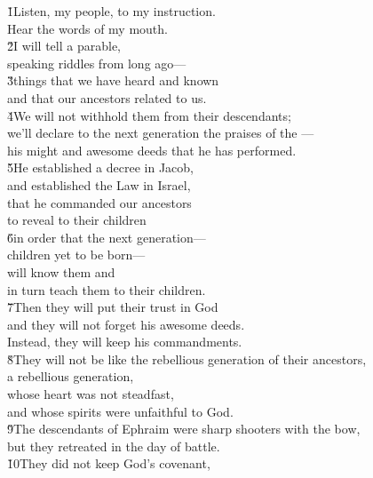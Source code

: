 \begin{poetry}
\poeml \v{1}Listen, my people, to my instruction. \\
\poemll    Hear the words of my mouth. \\
\poeml \v{2}I will tell a parable, \\
\poemll    speaking riddles from long ago--- \\
\poeml \v{3}things that we have heard and known \\
\poemll    and that our ancestors related to us. \\
\poeml \v{4}We will not withhold them from their descendants; \\
\poemll    we'll declare to the next generation the praises of the --- \\
\poemlll       his might and awesome deeds that he has performed. \\
\poeml \v{5}He established a decree in Jacob, \\
\poemll    and established the Law in Israel, \\
\poeml that he commanded our ancestors \\
\poemll    to reveal to their children \\
\poeml \v{6}in order that the next generation--- \\
\poemll    children yet to be born--- \\
\poeml will know them and \\
\poemll    in turn teach them to their children. \\
\poeml \v{7}Then they will put their trust in God \\
\poemll    and they will not forget his awesome deeds. \\
\poemlll       Instead, they will keep his commandments. \\
\poeml \v{8}They will not be like the rebellious generation of their ancestors, \\
\poemll    a rebellious generation, \\
\poeml whose heart was not steadfast, \\
\poemll    and whose spirits were unfaithful to God. \\
\poeml \v{9}The descendants of Ephraim were sharp shooters with the bow, \\
\poemll    but they retreated in the day of battle. \\
\poeml \v{10}They did not keep God's covenant, \\

\end{poetry}
